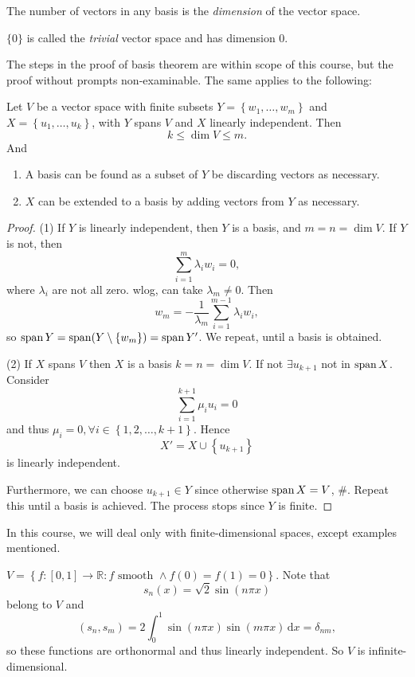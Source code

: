 \documentclass[a4paper]{article}
\begin{document}
\begin{definition}
  The number of vectors in any basis is the \textit{dimension} of the
  vector space.
\end{definition}
\begin{remark}
  $\{0\}$ is called the \textit{trivial} vector space and has dimension 0.

  The steps in the proof of basis theorem are within scope of this
  course, but the proof without prompts non-examinable. The same
  applies to the following:
\end{remark}
\begin{proposition}\label{prop:reduce_span}
  Let $V$ be a vector space with finite subsets $ Y=\left\{
  w_1,\dots,w_m\right\}$ and $ X=\left\{ u_1,\dots,u_k\right\} $,
  with $Y$ spans $V$ and $X$ linearly independent. Then
  \[
    k\le \dim V\le m
  .\]
  And
  \begin{enumerate}[(1)]
    \item A basis can be found as a subset of $Y$ be discarding
      vectors as necessary.
    \item $X$ can be extended to a basis by adding vectors from $Y$
      as necessary.
  \end{enumerate}
\end{proposition}
\begin{proof}
  (1) If $Y$ is linearly independent, then $Y$ is a basis, and
  $m=n=\dim V$. If $Y$ is not, then
  \[
    \sum_{i=1}^{m}\lambda_i w_i=0
  ,\]
  where $ \lambda_i $ are not all zero. wlog, can take $\lambda_m\neq 0.$ Then
  \[
    w_m=-\frac{1}{\lambda_m}\sum_{i=1}^{m-1}\lambda_i w_i
  ,\]
  so $ \operatorname{span} Y=\operatorname{span} (Y\setminus \left\{ w_m\right\})=\operatorname{span} Y' $. We
  repeat, until a basis is obtained.

  (2) If $X$ spans $V$ then $X$ is a basis $k=n=\dim V$. If not $
  \exists u_{k+1} $ not in $\operatorname{span} X$. Consider
  \[
    \sum_{i=1}^{k+1}\mu_i u_i=0
  \]
  and thus $\mu_{i}=0, \forall i\in \left\{ 1,2,\dots,k+1\right\}$. Hence
  \[
    X'=X \cup \left\{ u_{k+1}\right\}
  \]
  is linearly independent.

  Furthermore, we can choose $u_{k+1}\in Y$ since otherwise $ \operatorname{span}
  X=V $, \#. Repeat this until a basis is achieved. The process stops
  since $Y$ is finite.
\end{proof}
In this course, we will deal only with finite-dimensional spaces,
except examples mentioned.
\begin{example}
  $ V=\left\{ f:[0,1] \to \mathbb{R} : f\text{ smooth } \land
  f(0)=f(1)=0\right\} $. Note that
  \[s_n(x)=\sqrt{2}\sin(n\pi x)\]
  belong to $V$ and
  \[
    (s_n,s_m)=2 \int_{0}^{1} \sin(n\pi x)\sin(m\pi x) \,\mathrm{d}x=\delta_{nm},
  \]
  so these functions are orthonormal and thus linearly independent.
  So $V$ is infinite-dimensional.
\end{example}
\end{document}
